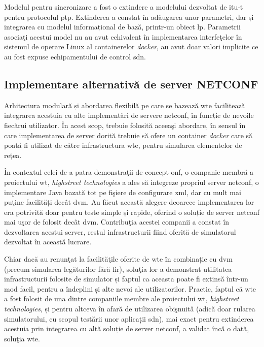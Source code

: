 Modelul pentru sincronizare a fost o extindere a modelului dezvoltat de \gls{itu-t} pentru protocolul \gls{ptp}. Extinderea a constat în adăugarea unor parametri, dar și integrarea cu modelul informațional de bază, printr-un obiect \gls{lp}. Parametrii asociaţi acestui model nu au avut echivalent în implementarea interfeţelor în sistemul de operare Linux al containerelor \textit{docker}, au avut doar valori implicite ce au fost expuse echipamentului de control \gls{sdn}.

\subsection{Implementare alternativă de server NETCONF}

Arhitectura modulară și abordarea flexibilă pe care se bazează \gls{wte} facilitează integrarea acestuia cu alte implementări de servere \gls{netconf}, în funcție de nevoile fiecărui utilizator. În acest scop, trebuie folosită aceeaşi abordare, în sensul în care implementarea de server dorită trebuie să ofere un container \textit{docker} care să poată fi utilizat de către infrastructura \gls{wte}, pentru simularea elementelor de rețea.

În contextul celei de-a patra demonstraţii de concept \gls{onf}, o companie membră a proiectului \gls{wt}, \textit{highstreet technologies} a ales să integreze propriul server \gls{netconf}, o implementare Java bazată tot pe fişiere de configurare \gls{xml}, dar cu mult mai puţine facilități decât \gls{dvm}. Au făcut această alegere deoarece implementarea lor era potrivită doar pentru teste simple și rapide, oferind o soluție de server \gls{netconf} mai uşor de folosit decât \gls{dvm}. Contribuţia acestei companii a constat în dezvoltarea acestui server, restul infrastructurii fiind oferită de simulatorul dezvoltat în această lucrare.

Chiar dacă au renunţat la facilităţile oferite de \gls{wte} în combinație cu \gls{dvm} (precum simularea legăturilor fără fir), soluţia lor a demonstrat utilitatea infrastructurii folosite de simulator și faptul ca aceasta poate fi extinsă într-un mod facil, pentru a îndeplini și alte nevoi ale utilizatorilor. Practic, faptul că \gls{wte} a fost folosit de una dintre companiile membre ale proiectului \gls{wt}, \textit{highstreet technologies}, și pentru altceva în afară de utilizarea obişnuită (adică doar rularea simulatorului, cu scopul testării unor aplicații \gls{sdn}), mai exact pentru extinderea acestuia prin integrarea cu altă soluție de server \gls{netconf}, a validat încă o dată, soluţia \gls{wte}.

